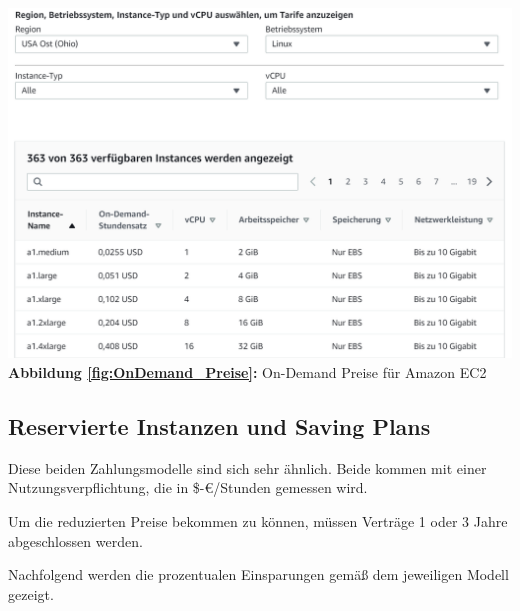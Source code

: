 \begin{center}
    \includegraphics[scale=0.4]{sources/On-Demand-Pläne für Amazon EC2}\label{fig:OnDemand_Preise}\\
    \textbf{Abbildung \autoref{fig:OnDemand_Preise}:} On-Demand Preise für Amazon EC2
        {\cite{AMZ02}}
\end{center}
\subsection{Reservierte Instanzen und Saving Plans}
\begin{flushleft}
    Diese beiden Zahlungsmodelle sind sich sehr ähnlich. Beide kommen mit einer Nutzungsverpflichtung, die in \$-€/Stunden gemessen wird.

    Um die reduzierten Preise bekommen zu können, müssen Verträge 1 oder 3 Jahre abgeschlossen werden.

    Nachfolgend werden die prozentualen Einsparungen gemäß dem jeweiligen Modell gezeigt.
\end{flushleft}

